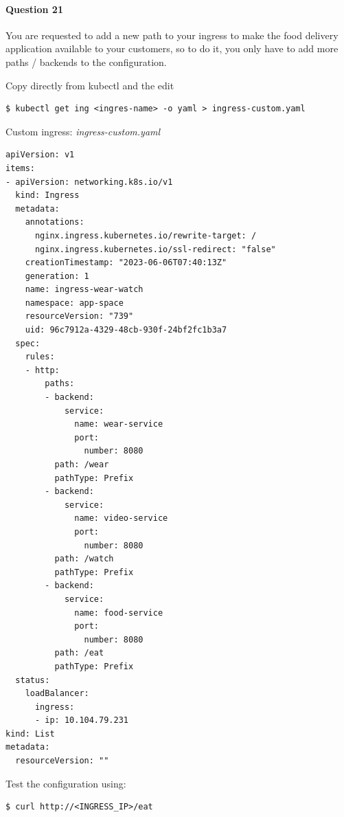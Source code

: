 \documentclass{article}
\newenvironment{blocktemplateI}[1]{%
    \tcolorbox[beamer,%
    noparskip,breakable,
    colframe=Violet,%
    colbacklower=Black,%
    title=#1]}%
    {\endtcolorbox}
\newenvironment{codetemplate}[1][]{%
  \mybasecolorbox[#1]
  \itshape
}{%
  \endmybasecolorbox
}
\begin{document}
\paragraph{Question 21}

You are requested to add a new path to your ingress to make the food delivery application available to your customers, so to do it, you only have to add more paths / backends to the configuration.

\begin{blocktemplateI}{NOTE}
Copy directly from kubectl and the edit
\begin{codetemplate}{}
\begin{verbatim}
$ kubectl get ing <ingres-name> -o yaml > ingress-custom.yaml
\end{verbatim}
\end{codetemplate}
\end{blocktemplateI}

\newpage
Custom ingress:
\begin{codetemplate}{ingress-custom.yaml}
\begin{verbatim}
apiVersion: v1
items:
- apiVersion: networking.k8s.io/v1
  kind: Ingress
  metadata:
    annotations:
      nginx.ingress.kubernetes.io/rewrite-target: /
      nginx.ingress.kubernetes.io/ssl-redirect: "false"
    creationTimestamp: "2023-06-06T07:40:13Z"
    generation: 1
    name: ingress-wear-watch
    namespace: app-space
    resourceVersion: "739"
    uid: 96c7912a-4329-48cb-930f-24bf2fc1b3a7
  spec:
    rules:
    - http:
        paths:
        - backend:
            service:
              name: wear-service
              port:
                number: 8080
          path: /wear
          pathType: Prefix
        - backend:
            service:
              name: video-service
              port:
                number: 8080
          path: /watch
          pathType: Prefix
        - backend:
            service:
              name: food-service
              port:
                number: 8080
          path: /eat
          pathType: Prefix
  status:
    loadBalancer:
      ingress:
      - ip: 10.104.79.231
kind: List
metadata:
  resourceVersion: ""
\end{verbatim}
\end{codetemplate}

Test the configuration using:

\begin{codetemplate}{}
\begin{verbatim}
$ curl http://<INGRESS_IP>/eat
\end{verbatim}
\end{codetemplate}
\end{document}

